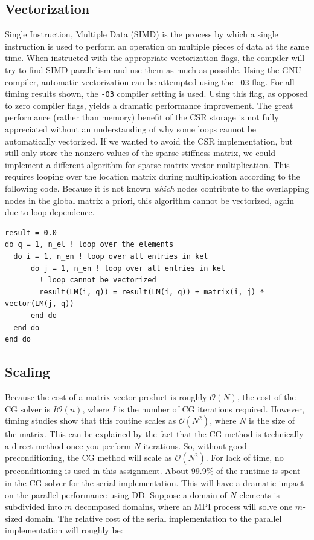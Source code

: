 \documentclass[10pt]{article}
\begin{document}
\subsection{Vectorization}

Single Instruction, Multiple Data (SIMD) is the process by which a single instruction is used to perform an operation on multiple pieces of data at the same time. When instructed with the appropriate vectorization flags, the compiler will try to find SIMD parallelism and use them as much as possible. Using the GNU compiler, automatic vectorization can be attempted using the {\tt -O3} flag. For all timing results shown, the {\tt -O3} compiler setting is used. Using this flag, as opposed to zero compiler flags, yields a dramatic performance improvement. The great performance (rather than memory) benefit of the CSR storage is not fully appreciated without an understanding of why some loops cannot be automatically vectorized. If we wanted to avoid the CSR implementation, but still only store the nonzero values of the sparse stiffness matrix, we could implement a different algorithm for sparse matrix-vector multiplication. This requires looping over the location matrix during multiplication according to the following code. Because it is not known {\it which} nodes contribute to the overlapping nodes in the global matrix a priori, this algorithm cannot be vectorized, again due to loop dependence. 

\begin{lstlisting}
result = 0.0
do q = 1, n_el ! loop over the elements
  do i = 1, n_en ! loop over all entries in kel
      do j = 1, n_en ! loop over all entries in kel
        ! loop cannot be vectorized
        result(LM(i, q)) = result(LM(i, q)) + matrix(i, j) * vector(LM(j, q))
      end do
  end do
end do
\end{lstlisting}


\subsection{Scaling}
Because the cost of a matrix-vector product is roughly \(\mathscr{O}(N)\), the cost of the CG solver is \(I\mathscr{O}(n)\), where \(I\) is the number of CG iterations required. However, timing studies show that this routine scales as \(\mathscr{O}(N^2)\), where \(N\) is the size of the matrix. This can be explained by the fact that the CG method is technically a direct method once you perform \(N\) iterations. So, without good preconditioning, the CG method will scale as \(\mathscr{O}(N^2)\). For lack of time, no preconditioning is used in this assignment. About 99.9\% of the runtime is spent in the CG solver for the serial implementation. This will have a dramatic impact on the parallel performance using DD. Suppose a domain of \(N\) elements is subdivided into \(m\) decomposed domains, where an MPI process will solve one \(m\)-sized domain. The relative cost of the serial implementation to the parallel implementation will roughly be:
\end{document}
